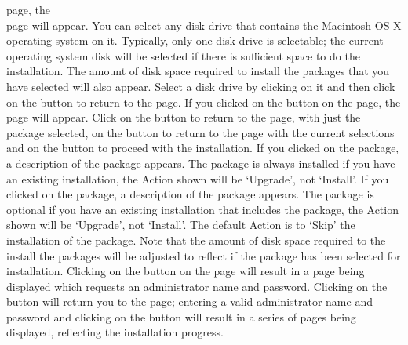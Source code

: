  page, the\\
 page will appear.
You can select any disk drive that contains the Macintosh OS X operating system on it.
Typically, only one disk drive is selectable; the current operating system disk will be
selected if there is sufficient space to do the installation.
The amount of disk space required to install the packages that you have selected will also
appear.
Select a disk drive by clicking on it and then click on the  button
to return to the  page.
\condPage{}
If you clicked on the  button on the 
page, the  page will appear.
Click on the  button to return to the
 page, with just the  package selected, on the
 button to return to the  page with the
current selections and on the  button to proceed with the
installation.
\condPage{}
If you clicked on the  package, a description of the package appears.
The  package is always installed \longDash{} if you have an existing
\mplusm{} installation, the Action shown will be `Upgrade', not `Install'.
\condPage{}
If you clicked on the  package, a description of the package appears.
The  package is optional \longDash{} if you have an existing \mplusm{}
installation that includes the  package, the Action shown will be
`Upgrade', not `Install'.
The default Action is to `Skip' the installation of the  package.
Note that the amount of disk space required to the install the packages will be adjusted
to reflect if the  package has been selected for installation.
\condPage{}
Clicking on the  button on the  page
will result in a page being displayed which requests an administrator name and password.
Clicking on the  button will return you to the
 page; entering a valid administrator name and password and
clicking on the  button will result in a series of pages
being displayed, reflecting the installation progress.
